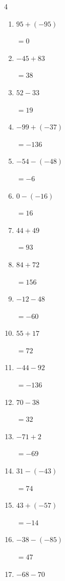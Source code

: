 \begin{multicols}{4}
\begin{enumerate}
        $=-3$

  \item $95+(-95)$

        $=0$

  \item $-45+83$

        $=38$

  \item $52-33$

        $=19$

  \item $-99+(-37)$

        $=-136$

  \item $-54-(-48)$

        $=-6$

  \item $0-(-16)$

        $=16$

  \item $44+49$

        $=93$

  \item $84+72$

        $=156$

  \item $-12-48$

        $=-60$

  \item $55+17$

        $=72$

\columnbreak %

  \item $-44-92$

        $=-136$

  \item $70-38$

        $=32$

  \item $-71+2$

        $=-69$

  \item $31-(-43)$

        $=74$

  \item $43+(-57)$

        $=-14$

  \item $-38-(-85)$

        $=47$

  \item $-68-70$


\end{enumerate}
\end{multicols}
